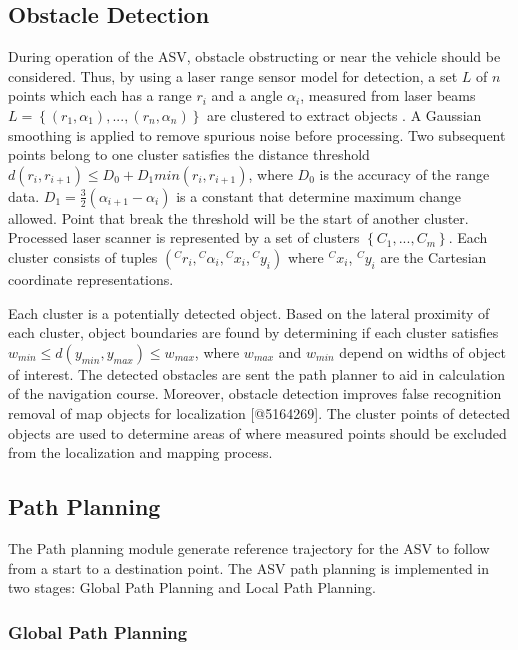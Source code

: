 \documentclass[10 pt,a4paper,conference]{IEEEtran}
\begin{document}
\subsection{Obstacle Detection}\label{obstacle-detection}

During operation of the ASV, obstacle obstructing or near the vehicle
should be considered. Thus, by using a laser range sensor model for
detection, a set $L$ of $n$ points which each has a range $r_{i}$ and a
angle $\alpha_{i}$, measured from laser beams
$L=\left\{(r_{1},\alpha_{1}),...,(r_{n},\alpha_{n})\right\}$ are
clustered to extract objects \citep{Juric-Kavelj2008_407}. A Gaussian
smoothing is applied to remove spurious noise before processing. Two
subsequent points belong to one cluster satisfies the distance threshold
$d(r_{i},r_{i+1}) \leq D_{0}+D_{1}min(r_{i},r_{i+1})$, where $D_{0}$ is
the accuracy of the range data.
$D_{1} = \frac{3}{2}(\alpha_{i+1}-\alpha_{i})$ is a constant that
determine maximum change allowed. Point that break the threshold will be
the start of another cluster. Processed laser scanner is represented by
a set of clusters $\left\{ C_{1},...,C_{m} \right\}$. Each cluster
consists of tuples
$({}^{C}r_{i},{}^{C}\alpha_{i},{}^{C}x_{i},{}^{C}y_{i})$ where
${}^{C}x_{i}$, ${}^{C}y_{i}$ are the Cartesian coordinate
representations.

Each cluster is a potentially detected object. Based on the lateral
proximity of each cluster, object boundaries are found by determining if
each cluster satisfies $w_{min} \leq d(y_{min},y_{max})  \leq w_{max}$,
where $w_{max}$ and $w_{min}$ depend on widths of object of interest.
The detected obstacles are sent the path planner to aid in calculation
of the navigation course. Moreover, obstacle detection improves false
recognition removal of map objects for localization {[}@5164269{]}. The
cluster points of detected objects are used to determine areas of where
measured points should be excluded from the localization and mapping
process.

\subsection{Path Planning}\label{path-planning}

The Path planning module generate reference trajectory for the ASV to
follow from a start to a destination point. The ASV path planning is
implemented in two stages: Global Path Planning and Local Path Planning.

\subsubsection{Global Path Planning}\label{global-path-planning}
\end{document}
